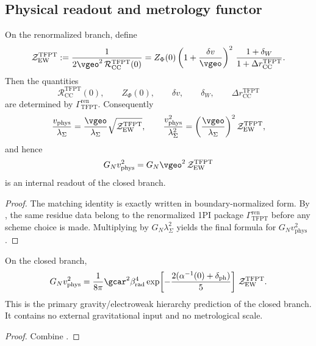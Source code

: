 \subsection{Physical readout and metrology functor}

\begin{theorem}
\label{thm:dimensionless-ew-residue-matching}
On the renormalized branch, define
\[
\mathcal Z_{\mathrm{EW}}^{\mathrm{TFPT}}
:=
\frac{1}{2\vgeo^2\,\mathcal R_{\mathrm{CC}}^{\mathrm{TFPT}}(0)}
=
Z_\Phi(0)\left(1+\frac{\delta v}{\vgeo}\right)^2
\,\frac{1+\delta_W}{1+\Delta r_{\mathrm{CC}}^{\mathrm{TFPT}}}.
\]
Then the quantities
\[
\mathcal R_{\mathrm{CC}}^{\mathrm{TFPT}}(0),
\qquad
Z_\Phi(0),
\qquad
\delta v,
\qquad
\delta_W,
\qquad
\Delta r_{\mathrm{CC}}^{\mathrm{TFPT}}
\]
are determined by $\Gamma_{\mathrm{TFPT}}^{\mathrm{ren}}$. Consequently
\[
\frac{v_{\mathrm{phys}}}{\lambda_\Sigma}
=
\frac{\vgeo}{\lambda_\Sigma}\sqrt{\mathcal Z_{\mathrm{EW}}^{\mathrm{TFPT}}},
\qquad
\frac{v_{\mathrm{phys}}^2}{\lambda_\Sigma^2}
=
\left(\frac{\vgeo}{\lambda_\Sigma}\right)^2\mathcal Z_{\mathrm{EW}}^{\mathrm{TFPT}},
\]
and hence
\[
G_Nv_{\mathrm{phys}}^2
=
G_N\vgeo^2\,\mathcal Z_{\mathrm{EW}}^{\mathrm{TFPT}}
\]
is an internal readout of the closed branch.
\end{theorem}

\begin{proof}
The matching identity is exactly  written in
boundary-normalized form. By , the same residue data belong to
the renormalized 1PI package $\Gamma_{\mathrm{TFPT}}^{\mathrm{ren}}$ before any scheme choice is
made. Multiplying by $G_N\lambda_\Sigma^2$ yields the final formula for $G_Nv_{\mathrm{phys}}^2$.
\end{proof}

\begin{corollary}
\label{cor:dimensionless-gravitational-ew-metrology}
On the closed branch,
\[
G_Nv_{\mathrm{phys}}^2
=
\frac{1}{8\pi}\gcar^2\beta_{\mathrm{rad}}^4
\exp\!\left[-\frac{2(\alpha^{-1}(0)+\delta_{\mathrm{ph}})}{5}\right]
\,\mathcal Z_{\mathrm{EW}}^{\mathrm{TFPT}}.
\]
This is the primary gravity/electroweak hierarchy prediction of the closed branch. It contains no
external gravitational input and no metrological scale.
\end{corollary}

\begin{proof}
Combine .
\end{proof}

